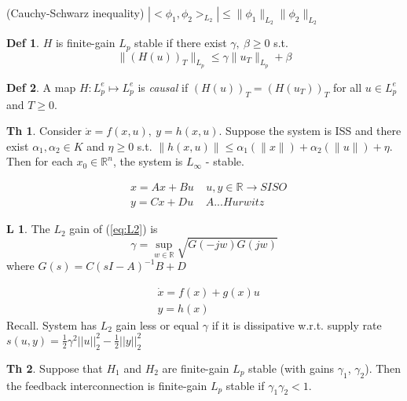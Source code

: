 \documentclass[9pt,landscape]{article}
\theoremstyle{definition}
\newtheorem*{Theorem}{Th}
\newtheorem*{Lemma}{L}
\newtheorem*{Definition}{Def}
\begin{document}
\begin{multicols}{4}
(Cauchy-Schwarz inequality) $|<\phi_1,\phi_2>_{L_2}| \leq \|\phi_1\|_{L_2}\|\phi_2\|_{L_2}$

\begin{Definition}
$H$ is finite-gain $L_p$ stable if there exist $\gamma, \ \beta \geq 0$ s.t. 
\begin{equation*}\label{finite_gain}
\|(H(u))_T\|_{L_p} \leq \gamma \|u_T\|_{L_p} + \beta 
\end{equation*}
\end{Definition}

\begin{Definition}
A map $H: L_p^e \mapsto L_p^e$ is {\it causal} if $(H(u))_T = (H(u_T))_T$ for all $u \in L_p^e$ and $T \geq 0$. 
\end{Definition}

\begin{Theorem}
Consider $\dot{x} = f(x,u), \ y = h(x,u)$. Suppose the system is ISS and there exist $\alpha_1, \alpha_2 \in K$ and $\eta \geq 0$ s.t. $\|h(x,u)\| \leq \alpha_1(\|x\|) + \alpha_2(\|u\|) + \eta$. Then for each $x_0 \in \mathbb{R}^n$, the system is $L_{\infty}$ - stable.
\end{Theorem}
\begin{equation} \label{eq:L2}
\begin{split}
&x=Ax+Bu \ \ \ \ \ u,y\in\mathbb{R}\rightarrow SISO\\
&y=Cx+Du \ \ \ \ \ A ... Hurwitz
\end{split}
\end{equation}
 \begin{Lemma}
The $L_2$ gain of (\ref{eq:L2}) is
$$\gamma=\sup_{w\in\mathbb{R}}\sqrt{G(-jw)G(jw)}$$
 where $G(s)=C(sI-A)^{-1}B+D$
 \end{Lemma}
\begin{equation} \label{eq:L2af}
\begin{split}
&\dot x = f(x) +g(x)u\\
&y = h(x)
\end{split}
\end{equation}
 Recall. System has $L_2$ gain less or equal $\gamma$ if it is dissipative w.r.t. supply
rate $s(u,y)=\frac{1}{2}\gamma^2||u||^2_2-\frac{1}{2}||y||_2^2$

\begin{Theorem}
 Suppose that $H_1$ and $H_2$ are finite-gain $L_p$ stable (with gains $\gamma_1$, $\gamma_2$).
 Then the feedback interconnection is finite-gain $L_p$ stable if $\gamma_1\gamma_2<1$.
\end{Theorem}


\end{multicols}
\end{document}
